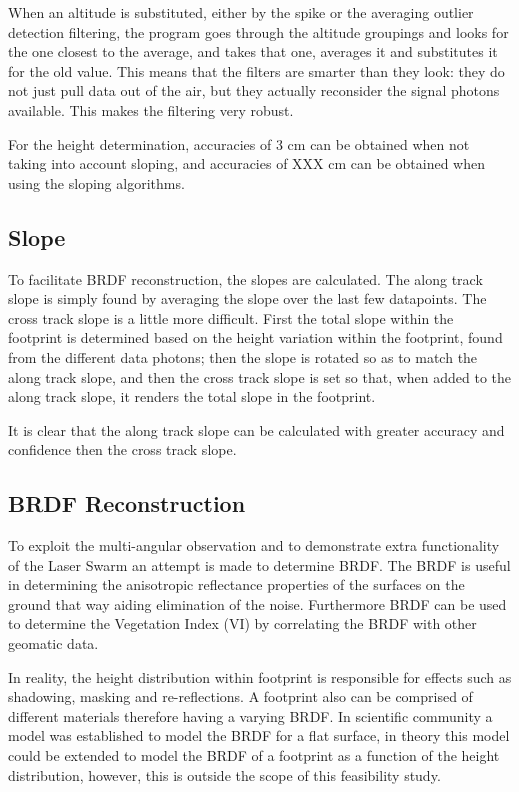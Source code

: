 When an altitude is substituted, either by the spike or the averaging outlier detection filtering, the program goes through the altitude groupings and looks for the one closest to the average, and takes that one, averages it and substitutes it for the old value. This means that the filters are smarter than they look: they do not just pull data out of the air, but they actually reconsider the signal photons available. This makes the filtering very robust.

For the height determination, accuracies of 3 cm can be obtained when not taking into account sloping, and accuracies of XXX cm can be obtained when using the sloping algorithms. 

\subsection{Slope}
\label{sec:Slope}
To facilitate BRDF reconstruction, the slopes are calculated. The along track slope is simply found by averaging the slope over the last few datapoints. The cross track slope is a little more difficult. First the total slope within the footprint is determined based on the height variation within the footprint, found from the different data photons; then the slope is rotated so as to match the along track slope, and then the cross track slope is set so that, when added to the along track slope, it renders the total slope in the footprint.

It is clear that the along track slope can be calculated with greater accuracy and confidence then the cross track slope.

\subsection{BRDF Reconstruction}
\label{sec:BRDFReconstuction}

To exploit the multi-angular observation and to demonstrate extra functionality of the Laser Swarm an attempt is made to determine BRDF. 
The BRDF is useful in determining the anisotropic reflectance properties of the surfaces on the ground that way aiding elimination of the noise. Furthermore BRDF can be used to determine the Vegetation Index (VI) by correlating the BRDF with other geomatic data. 

In reality, the height distribution within footprint is responsible for effects such as shadowing, masking and re-reflections. A footprint also can be comprised of different materials therefore having a varying BRDF. In scientific community a model was established to model the BRDF for a flat surface, in theory this model could be extended to model the BRDF of a footprint as a function of the height distribution, however, this is outside the scope of this feasibility study. 

